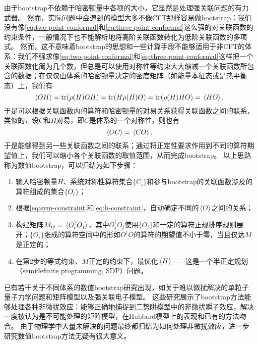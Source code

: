 \documentclass[hyperref, UTF8, a4paper]{ctexart}
\begin{document}
由于bootstrap不依赖于哈密顿量中各项的大小，它显然是处理强关联问题的有力武器。
然而，实际问题中会遇到的模型大多不像CFT那样容易做bootstrap：我们没有像\eqref{eq:two-point-conformal}和\eqref{eq:three-point-conformal}这么强的对关联函数的约束条件，一般情况下也不能解析地将高阶关联函数转化为低阶关联函数的多项式。
然而，这不意味着bootstrap的思想和一些计算手段不能够适用于非CFT的体系：我们不强求像\eqref{eq:two-point-conformal}和\eqref{eq:three-point-conformal}这样把一个关联函数化简为几个数，但总是可以使用对称性等约束大大缩减一个关联函数所包含的数据；在仅仅由体系的哈密顿量决定的密度矩阵（如能量本征态或是热平衡态）上，我们有
\begin{equation}
    \expval*{O H} = \trace (\rho(H) O H) = \trace(H \rho(H) O) = \trace(\rho(H) H O)  = \expval*{H {O}},
    \label{eq:h-constraint}
\end{equation}
于是可以根据关联函数内的算符和哈密顿量的对易关系获得关联函数之间的联系，类似的，设$C$和$H$对易，即$C$是体系的一个对称性，则也有
\begin{equation}
    \expval*{O C} = \expval*{C {O}},
    \label{eq:sym-constraint}
\end{equation}
于是能够得到另一些关联函数之间的联系；通过将正定性要求作用到不同的算符期望值上，我们可以缩小各个关联函数的取值范围，从而完成bootstrap。
以上思路称为数值bootstrap，可以归结为如下步骤：
\begin{enumerate}
  \item 输入哈密顿量$H$、系统对称性算符集合$\{C_i\}$和参与bootstrap的关联函数涉及的算符组成的集合$\{O_i\}$；
  \item 根据\eqref{eq:sym-constraint}和\eqref{eq:h-constraint}，自动确定不同的$\expval*{O}$之间的关系；
  \item 构建矩阵$M_{ij} = \expval*{O_i^\dagger O_j}$，其中$O_i^\dagger O_j$使用$\{O_i\}$和一定的算符正规排序规则展开；$\{O_i\}$张成的算符空间中的形如$O^\dagger O$的算符的期望值不小于零，当且仅达$M$是正定的；
  \item 在第2步的等式约束、$M$正定的约束下，最优化$\expval*{H}$——这是一个半正定规划（semidefinite programming, SDP）问题。
\end{enumerate}

已有若干关于不同体系的数值bootstrap研究出现，如关于难以微扰解决的单粒子量子力学问题和矩阵模型\cite{han_matrix,bhattacharya2021,kazakov2021analytic}以及强关联电子模型\cite{han_manybody}。
这些研究展示了bootstrap方法能够处理各种非微扰效应：能够正确地捕捉到二势阱模型中的非微扰瞬子效应\cite{bhattacharya2021}，解决一度被认为是不可能处理的矩阵模型\cite{kazakov2021analytic}，在Hubbard模型上的表现和已有的方法吻合\cite{han_manybody}。
由于物理学中大量未解决的问题最终都归结为如何处理非微扰效应，进一步研究数值bootstrap方法无疑有很大意义。
\end{document}
